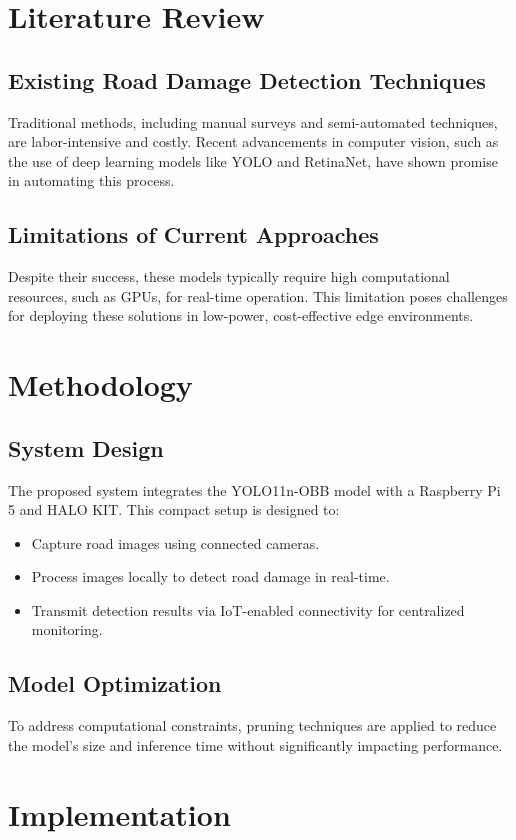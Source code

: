 \documentclass[12pt,a4paper]{report}
\begin{document}
\chapter{Literature Review}
\section{Existing Road Damage Detection Techniques}
Traditional methods, including manual surveys and semi-automated techniques, are labor-intensive and costly. Recent advancements in computer vision, such as the use of deep learning models like YOLO and RetinaNet, have shown promise in automating this process.

\section{Limitations of Current Approaches}
Despite their success, these models typically require high computational resources, such as GPUs, for real-time operation. This limitation poses challenges for deploying these solutions in low-power, cost-effective edge environments.

\chapter{Methodology}
\section{System Design}
The proposed system integrates the YOLO11n-OBB model with a Raspberry Pi 5 and HALO KIT. This compact setup is designed to:
\begin{itemize}
    \item Capture road images using connected cameras.
    \item Process images locally to detect road damage in real-time.
    \item Transmit detection results via IoT-enabled connectivity for centralized monitoring.
\end{itemize}

\section{Model Optimization}
To address computational constraints, pruning techniques are applied to reduce the model's size and inference time without significantly impacting performance.

\chapter{Implementation}
\end{document}
